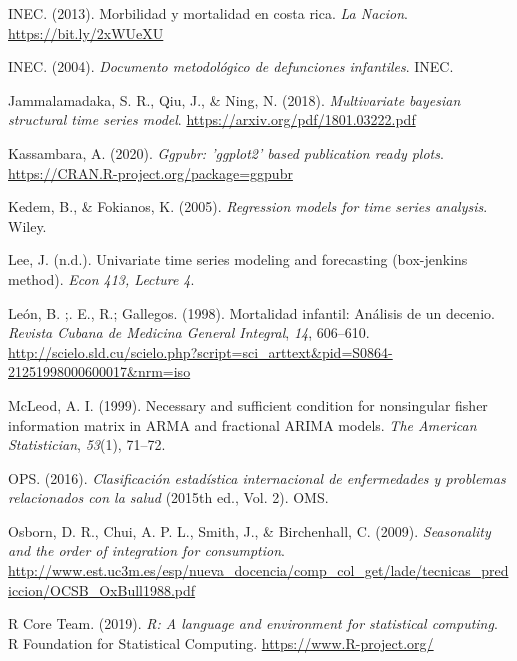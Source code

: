 \documentclass[
]{article}
\newlength{\cslhangindent}
\newlength{\cslentryspacingunit} %
\newenvironment{CSLReferences}[2] %
 {%
  \setlength{\parindent}{0pt}
  \ifodd #1
  \let\oldpar\par
  \def\par{\hangindent=\cslhangindent\oldpar}
  \fi
  \setlength{\parskip}{#2\cslentryspacingunit}
 }%
 {}
\begin{document}
\begin{CSLReferences}{1}{0}
\leavevmode{}%
INEC. (2013). Morbilidad y mortalidad en costa rica. \emph{La Nacion}.
\url{https://bit.ly/2xWUeXU}

\leavevmode{}%
INEC. (2004). \emph{Documento metodológico de defunciones infantiles}.
INEC.

\leavevmode{}%
Jammalamadaka, S. R., Qiu, J., \& Ning, N. (2018). \emph{Multivariate
bayesian structural time series model}.
\url{https://arxiv.org/pdf/1801.03222.pdf}

\leavevmode{}%
Kassambara, A. (2020). \emph{Ggpubr: 'ggplot2' based publication ready
plots}. \url{https://CRAN.R-project.org/package=ggpubr}

\leavevmode{}%
Kedem, B., \& Fokianos, K. (2005). \emph{Regression models for time
series analysis}. Wiley.

\leavevmode{}%
Lee, J. (n.d.). Univariate time series modeling and forecasting
(box-jenkins method). \emph{Econ 413, Lecture 4}.

\leavevmode{}%
León, B. ;. E., R.; Gallegos. (1998). {Mortalidad infantil: Análisis de
un decenio}. \emph{{Revista Cubana de Medicina General Integral}},
\emph{14}, 606--610.
\url{http://scielo.sld.cu/scielo.php?script=sci_arttext\&pid=S0864-21251998000600017\&nrm=iso}

\leavevmode{}%
McLeod, A. I. (1999). Necessary and sufficient condition for nonsingular
fisher information matrix in ARMA and fractional ARIMA models. \emph{The
American Statistician}, \emph{53}(1), 71--72.

\leavevmode{}%
OPS. (2016). \emph{Clasificación estadística internacional de
enfermedades y problemas relacionados con la salud} (2015th ed., Vol.
2). OMS.

\leavevmode{}%
Osborn, D. R., Chui, A. P. L., Smith, J., \& Birchenhall, C. (2009).
\emph{Seasonality and the order of integration for consumption}.
\url{http://www.est.uc3m.es/esp/nueva_docencia/comp_col_get/lade/tecnicas_prediccion/OCSB_OxBull1988.pdf}

\leavevmode{}%
R Core Team. (2019). \emph{R: A language and environment for statistical
computing}. R Foundation for Statistical Computing.
\url{https://www.R-project.org/}


\end{CSLReferences}
\end{document}
